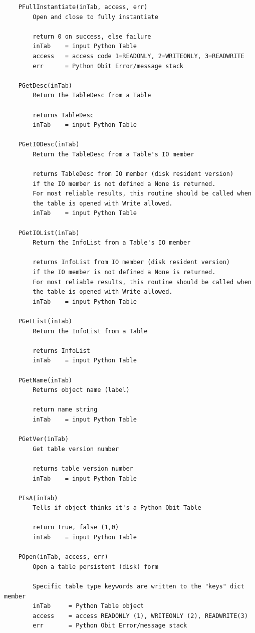 \documentclass[11pt]{report}
\begin{document}
\begin{verbatim}
    PFullInstantiate(inTab, access, err)
        Open and close to fully instantiate
        
        return 0 on success, else failure
        inTab    = input Python Table
        access   = access code 1=READONLY, 2=WRITEONLY, 3=READWRITE
        err      = Python Obit Error/message stack
    
    PGetDesc(inTab)
        Return the TableDesc from a Table
        
        returns TableDesc
        inTab    = input Python Table
    
    PGetIODesc(inTab)
        Return the TableDesc from a Table's IO member
        
        returns TableDesc from IO member (disk resident version)
        if the IO member is not defined a None is returned.
        For most reliable results, this routine should be called when
        the table is opened with Write allowed.
        inTab    = input Python Table
    
    PGetIOList(inTab)
        Return the InfoList from a Table's IO member
        
        returns InfoList from IO member (disk resident version)
        if the IO member is not defined a None is returned.
        For most reliable results, this routine should be called when
        the table is opened with Write allowed.
        inTab    = input Python Table
    
    PGetList(inTab)
        Return the InfoList from a Table
        
        returns InfoList
        inTab    = input Python Table
    
    PGetName(inTab)
        Returns object name (label)
        
        return name string
        inTab    = input Python Table
    
    PGetVer(inTab)
        Get table version number
        
        returns table version number
        inTab    = input Python Table
    
    PIsA(inTab)
        Tells if object thinks it's a Python Obit Table
        
        return true, false (1,0)
        inTab    = input Python Table
    
    POpen(inTab, access, err)
        Open a table persistent (disk) form
        
        Specific table type keywords are written to the "keys" dict member
        inTab     = Python Table object
        access    = access READONLY (1), WRITEONLY (2), READWRITE(3)
        err       = Python Obit Error/message stack
    

\end{verbatim}
\end{document}
